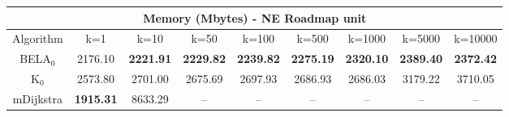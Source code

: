 \begin{tabular}{c|cccccccc}\toprule
\multicolumn{9}{c}{Memory (Mbytes) - NE Roadmap unit}\\ \midrule
Algorithm & k=1 & k=10 & k=50 & k=100 & k=500 & k=1000 & k=5000 & k=10000 \\ \midrule
BELA$_0$ & 2176.10 & \textbf{2221.91} & \textbf{2229.82} & \textbf{2239.82} & \textbf{2275.19} & \textbf{2320.10} & \textbf{2389.40} & \textbf{2372.42} \\
K$_0$ & 2573.80 & 2701.00 & 2675.69 & 2697.93 & 2686.93 & 2686.03 & 3179.22 & 3710.05 \\
mDijkstra & \textbf{1915.31} & 8633.29 & -- & -- & -- & -- & -- & -- \\ \bottomrule 
\end{tabular}
